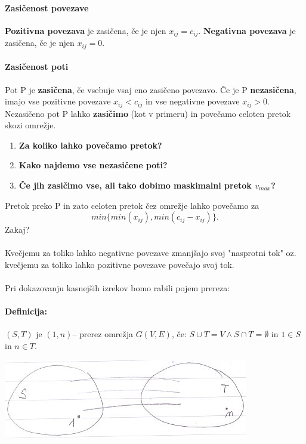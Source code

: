 \documentclass[a4paper,10pt]{article}
\begin{document}
\paragraph{Zasi\v cenost povezave}
\textbf{Pozitivna povezava} je zasi\v cena, \v ce je njen $x_{ij} = c_{ij}$.
\textbf{Negativna povezava} je zasi\v cena, \v ce je njen $x_{ij} = 0$.

\paragraph{Zasi\v cenost poti}
Pot P je \textbf{zasi\v cena}, \v ce vsebuje vsaj eno zasi\v ceno povezavo. \v Ce je P \textbf{nezasi\v cena}, imajo vse pozitivne povezave $x_{ij} < c_{ij}$ in vse negativne povezave $x_{ij} > 0$. Nezasi\v ceno pot P lahko \textbf{zasi\v cimo} (kot v primeru) in pove\v camo celoten pretok skozi omre\v zje.

\begin{enumerate}
\item \textbf{Za koliko lahko pove\v camo pretok?}
\item \textbf{Kako najdemo vse nezasi\v cene poti?}
\item \textbf{\v Ce jih zasi\v cimo vse, ali tako dobimo maskimalni pretok $v_{max}$?}
\end{enumerate}
Pretok preko P in zato celoten pretok \v cez omre\v zje lahko pove\v camo za 
$$min \{min(x_{ij}), min(c_{ij} - x_{ij})\}.$$
Zakaj?\\
\\
Kve\v cjemu za toliko lahko negativne povezave zmanj\v sajo svoj "nasprotni tok" oz. kve\v cjemu za toliko lahko pozitivne povezave pove\v cajo svoj tok.\\
\\
Pri dokazovanju kasnej\v sih izrekov bomo rabili pojem prereza:

\paragraph{Definicija:}
$(S, T)$ je $(1, n)$– prerez omre\v zja $G(V, E)$, \v ce: $S \cup T = V \wedge S \cap T = \emptyset$ in $1 \in S$ in $n \in T$.
	\begin{center}
	\includegraphics{Slike/MaxPretokPrerez.jpg}
	\end{center}
\end{document}
